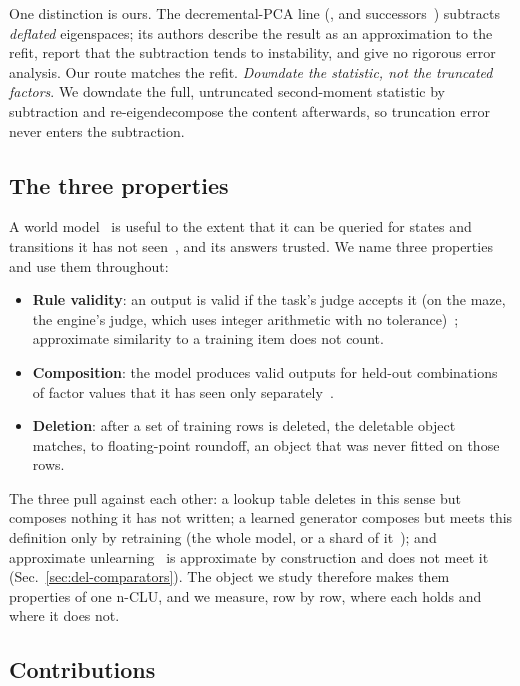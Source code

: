 \documentclass{article} %
\begin{document}
One distinction is ours. The decremental-PCA
line (\citealp{hall_adding_2002}, and successors~\citep{jin_evd_2014,lee_fast_2021}) subtracts \emph{deflated} eigenspaces;
its authors describe the result as an approximation to the refit, report that the subtraction
tends to instability, and give no rigorous error analysis. Our route matches the refit. \emph{Downdate the statistic, not the truncated factors}. We downdate the full,
untruncated second-moment statistic by subtraction and re-eigendecompose the content
afterwards, so truncation error never enters the subtraction.

\subsection{The three properties}
\label{sec:why}

A world model~\citep{ha_world_2018,hafner_mastering_2025} is useful to the extent that it can be queried for states and transitions it has
not seen~\citep{valevski_diffusion_2025}, and its answers trusted. We name three properties and use them throughout:
\begin{itemize}
\item \textbf{Rule validity}: an output is valid if the task's judge accepts it (on the maze, the engine's judge, which
uses integer arithmetic with no tolerance)~\citep{vafa_evaluating_2024}; approximate similarity to a training item does not count.
\item \textbf{Composition}: the model produces valid outputs for held-out combinations of
  factor values that it has seen only separately~\citep{zhao_toward_2022}.
\item \textbf{Deletion}: after a set of training rows
is deleted, the deletable object matches, to floating-point roundoff, an object that was never fitted
on those rows.
\end{itemize}
The three pull against each other: a lookup table deletes in this sense but
composes nothing it has not written; a learned generator composes but meets this definition only by
retraining (the whole model, or a shard of it~\citep{bourtoule_machine_2021}); and approximate unlearning~\citep{guo_certified_2023,golatkar_eternal_2020} is approximate by construction and does not meet it (Sec.~\ref{sec:del-comparators}). The object we study therefore makes them properties of one n-CLU, and we measure, row by row, where each holds and where it does not.

\subsection{Contributions}
\label{sec:contrib}
\end{document}
